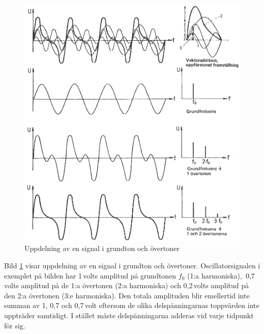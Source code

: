 \begin{figure}
	\includegraphics[width=.98\textwidth]{images/cropped_pdfs/bild_2_1-19.pdf}
	\caption{Uppdelning av en signal i grundton och övertoner}
	\label{fig:BildII1-19}
\end{figure}

Bild \ref{fig:BildII1-19} visar uppdelning av en signal i grundton och
övertoner.
Oscillatorsignalen i exemplet på bilden har 1\,volts amplitud på grundtonen
\(f_0\) (1:a harmoniska), \,0,7\,volts amplitud på de 1:a övertonen
(2:a harmoniska) och 0,2\,volts amplitud på den 2:a övertonen (3:e 
harmoniska).
Den totala amplituden blir emellertid inte summan av 1, 0,7 och
0,7\,volt eftersom de olika delspänningarnas toppvärden inte uppträder
samtidigt.
I stället måste delspänningarna adderas vid varje tidpunkt för sig.

